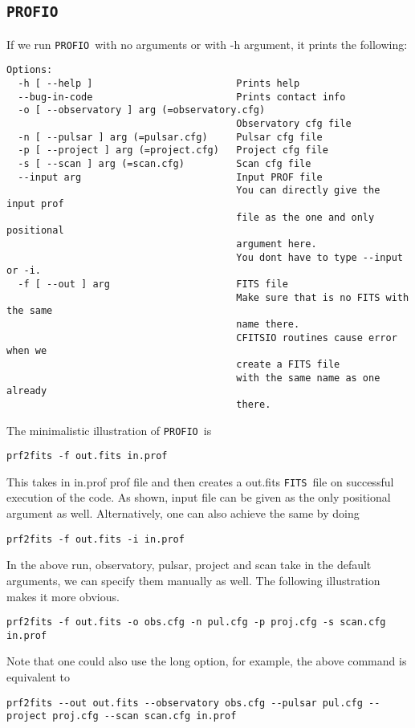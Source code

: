 \documentclass{article}
\newcommand{\prf}{\texttt{PROFIO}\ }
\newcommand{\fits}{\texttt{FITS}\ }
\begin{document}
\subsection*{\hfill \prf}
\par If we run \prf with no arguments or with -h argument, it prints the following:
\begin{lstlisting}
Options:
  -h [ --help ]                         Prints help
  --bug-in-code                         Prints contact info
  -o [ --observatory ] arg (=observatory.cfg)
                                        Observatory cfg file
  -n [ --pulsar ] arg (=pulsar.cfg)     Pulsar cfg file
  -p [ --project ] arg (=project.cfg)   Project cfg file
  -s [ --scan ] arg (=scan.cfg)         Scan cfg file
  --input arg                           Input PROF file
                                        You can directly give the input prof 
                                        file as the one and only positional 
                                        argument here.
                                        You dont have to type --input or -i.
  -f [ --out ] arg                      FITS file
                                        Make sure that is no FITS with the same
                                        name there.
                                        CFITSIO routines cause error when we 
                                        create a FITS file 
                                        with the same name as one already 
                                        there.
\end{lstlisting}
\par The minimalistic illustration of \prf is 
\begin{lstlisting}
prf2fits -f out.fits in.prof 
\end{lstlisting}
This takes in in.prof prof file and then creates a out.fits \fits file on successful execution of the code. As shown, input file can be given as the only positional argument as well. Alternatively, one can also achieve the same by doing 
\begin{lstlisting}
prf2fits -f out.fits -i in.prof
\end{lstlisting}
\par In the above run, observatory, pulsar, project and scan take in the default arguments, we can specify them manually as well. The following illustration makes it more obvious. 
\begin{lstlisting}
prf2fits -f out.fits -o obs.cfg -n pul.cfg -p proj.cfg -s scan.cfg in.prof
\end{lstlisting}
Note that one could also use the long option, for example, the above command is equivalent to 
\begin{lstlisting}
prf2fits --out out.fits --observatory obs.cfg --pulsar pul.cfg --project proj.cfg --scan scan.cfg in.prof 
\end{lstlisting}
\end{document}
